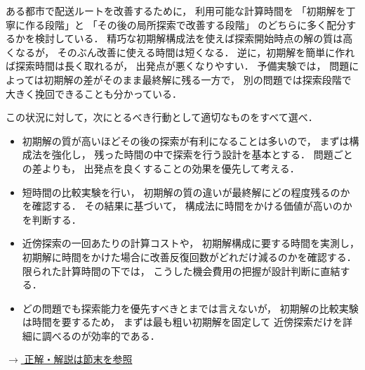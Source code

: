 \begin{example}[title={クイズ8：解法の設計2}]
ある都市で配送ルートを改善するために，
利用可能な計算時間を
「初期解を丁寧に作る段階」と
「その後の局所探索で改善する段階」
のどちらに多く配分するかを検討している．
精巧な初期解構成法を使えば探索開始時点の解の質は高くなるが，
そのぶん改善に使える時間は短くなる．
逆に，初期解を簡単に作れば探索時間は長く取れるが，
出発点が悪くなりやすい．
予備実験では，
問題によっては初期解の差がそのまま最終解に残る一方で，
別の問題では探索段階で大きく挽回できることも分かっている．

この状況に対して，次にとるべき行動として適切なものをすべて選べ．

\begin{itemize}
\item[(ア)]
初期解の質が高いほどその後の探索が有利になることは多いので，
まずは構成法を強化し，
残った時間の中で探索を行う設計を基本とする．
問題ごとの差よりも，
出発点を良くすることの効果を優先して考える．

\item[(イ)]
短時間の比較実験を行い，
初期解の質の違いが最終解にどの程度残るのかを確認する．
その結果に基づいて，
構成法に時間をかける価値が高いのかを判断する．

\item[(ウ)]
近傍探索の一回あたりの計算コストや，
初期解構成に要する時間を実測し，
初期解に時間をかけた場合に改善反復回数がどれだけ減るのかを確認する．
限られた計算時間の下では，
こうした機会費用の把握が設計判断に直結する．

\item[(エ)]
どの問題でも探索能力を優先すべきとまでは言えないが，
初期解の比較実験は時間を要するため，
まずは最も粗い初期解を固定して
近傍探索だけを詳細に調べるのが効率的である．
\end{itemize}

\hyperref[ans:heu-multi2-var]{$\rightarrow$ 正解・解説は節末を参照}
\end{example}

